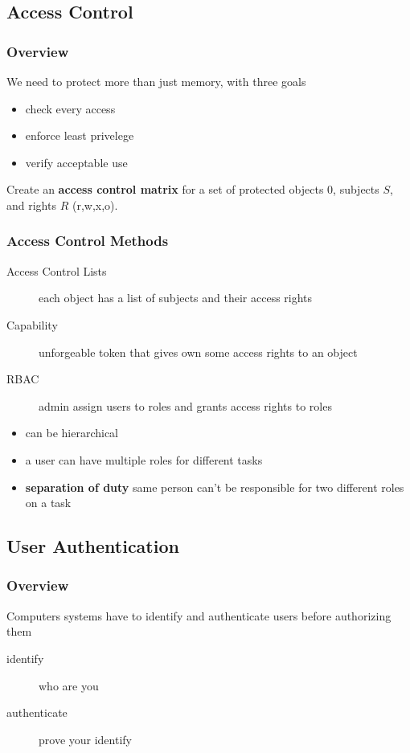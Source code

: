 \documentclass[]{article}
\theoremstyle{definition}
\begin{document}
	\subsection{Access Control}
	\subsubsection{Overview}
	We need to protect more than just memory, with three goals
	\begin{itemize}
		\item check every access
		\item enforce least privelege
		\item verify acceptable use
	\end{itemize}

	Create an \textbf{access control matrix} for a set of protected objects $0$, subjects $S$, and rights $R$ (r,w,x,o).

	\subsubsection{Access Control Methods}
	\begin{description}
		\item[Access Control Lists] each object has a list of subjects and their access rights
		\item[Capability] unforgeable token that gives own some access rights to an object
		\item[RBAC] admin assign users to roles and grants access rights to roles
	\end{description}
	\begin{itemize}
		\item can be hierarchical
		\item a user can have multiple roles for different tasks
		\item \textbf{separation of duty} same person can't be responsible for two different roles on a task
	\end{itemize}
	
	\subsection{User Authentication}
	\subsubsection{Overview}
	Computers systems have to identify and authenticate users before authorizing them
	\begin{description}
		\item[identify] who are you
		\item[authenticate] prove your identify
	\end{description}
\end{document}
